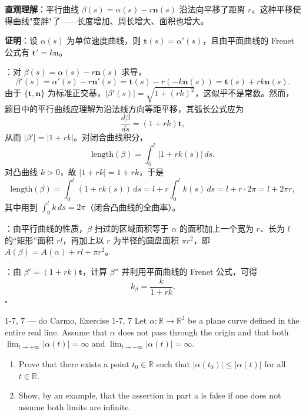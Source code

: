 \begin{solution}
\textbf{直观理解}：平行曲线 $\beta(s) = \alpha(s) - r\mathbf{n}(s)$ 沿法向平移了距离 $r$。这种平移使得曲线"变胖"了——长度增加、周长增大、面积也增大。

\textbf{证明}：设 $\alpha(s)$ 为单位速度曲线，则 $\mathbf{t}(s) = \alpha'(s)$，且由平面曲线的 Frenet 公式有 $\mathbf{t}' = k\mathbf{n}$。

\item[a. \textbf{长度}]：对 $\beta(s) = \alpha(s) - r\mathbf{n}(s)$ 求导，
\[
\beta'(s) = \alpha'(s) - r\mathbf{n}'(s) = \mathbf{t}(s) - r(-k\mathbf{n}(s)) = \mathbf{t}(s) + rk\mathbf{n}(s).
\]
由于 $\{\mathbf{t}, \mathbf{n}\}$ 为标准正交基，$|\beta'(s)| = \sqrt{1 + (rk)^2}$，这似乎不是常数。然而，题目中的平行曲线应理解为沿法线方向等距平移，其弧长公式应为
\[
\frac{d\beta}{ds} = (1 + rk)\mathbf{t},
\]
从而 $|\beta'| = |1 + rk|$。对闭合曲线积分，
\[
\text{length}(\beta) = \int_0^l |1 + rk(s)| \, ds.
\]
对凸曲线 $k > 0$，故 $|1 + rk| = 1 + rk$，于是
\[
\text{length}(\beta) = \int_0^l (1 + rk(s)) \, ds = l + r\int_0^l k(s) \, ds = l + r \cdot 2\pi = l + 2\pi r,
\]
其中用到 $\int_0^l k \, ds = 2\pi$（闭合凸曲线的全曲率）。

\item[b. \textbf{面积}]：由平行曲线的性质，$\beta$ 扫过的区域面积等于 $\alpha$ 的面积加上一个宽为 $r$、长为 $l$ 的``矩形''面积 $rl$，再加上以 $r$ 为半径的圆盘面积 $\pi r^2$，即 $A(\beta) = A(\alpha) + rl + \pi r^2$。

\item[c. \textbf{曲率}]：由 $\beta' = (1 + rk)\mathbf{t}$，计算 $\beta''$ 并利用平面曲线的 Frenet 公式，可得
\[
k_\beta = \frac{k}{1 + rk}.
\]
$\square$
\end{solution}

\begin{exercise}{1-7, 7 — do Carmo, Exercise 1-7, 7}
Let $\alpha: \mathbb{R} \to \mathbb{R}^2$ be a plane curve defined in the entire real line. Assume that $\alpha$ does not pass through the origin and that both $\lim_{t \to +\infty} |\alpha(t)| = \infty$ and $\lim_{t \to -\infty} |\alpha(t)| = \infty$.
\begin{enumerate}
\item[a.] Prove that there exists a point $t_0 \in \mathbb{R}$ such that $|\alpha(t_0)| \leq |\alpha(t)|$ for all $t \in \mathbb{R}$.
\item[b.] Show, by an example, that the assertion in part a is false if one does not assume both limits are infinite.
\end{enumerate}
\end{exercise}

